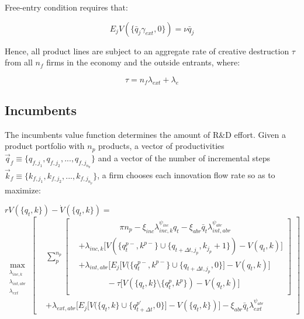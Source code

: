 \documentclass[letterpaper,12pt]{article}
\theoremstyle{definition}
\begin{document}
Free-entry condition requires that:

\begin{equation} \label{eq:Free-entry}
E_jV(\{\bar{q}_j\gamma_{ext},0\}) = \nu\bar{q}_j
\end{equation}

Hence, all product lines are subject to an aggregate rate of creative destruction $\tau$ from all $n_f$ firms in the economy and the outside entrants, where:

\begin{equation} \label{eq:Tau}
\tau = n_f\lambda_{ext} + \lambda_e
\end{equation}

\subsection{Incumbents}

The incumbents value function determines the amount of R\&D effort. Given a product portfolio with $n_p$ products, a vector of productivities $\overrightarrow{q}_f \equiv \{q_{f,j_1}, q_{f,j_2}, ..., q_{f,j_{n_p}}\}$ and a vector of the number of incremental steps $\overrightarrow{k}_f \equiv \{k_{f,j_1}, k_{f,j_2}, ..., k_{f,j_{n_p}}\}$, a firm chooses each innovation flow rate so as to maximize:

$rV(\{q_t,k\}) - \dot{V}(\{q_t,k\}) =$
\begin{equation} \label{eq:Vincumb}
\max_{\substack{\lambda_{inc,k}\\\lambda_{int, abr}\\\lambda_{ext}}}\left[\begin{aligned}
		&\sum_p^{n_p}\left[\begin{aligned}
			&\qquad\qquad\quad\pi n_{p} - \xi_{inc}\lambda_{inc,k}^{\psi_{inc}}q_t - \xi_{abr}\bar{q}_t\lambda_{int,abr}^{\psi_{abr}}\\
			& + \lambda_{inc,k}\big[V(\{q_t^{p-}, k^{p-}\}\cup \{q_{t+\Delta t, j_p}, k_{j_p} + 1\}) - V(q_{t},k)\big]\\
			&+ \lambda_{int, abr}\big[E_j\big[V(\{q_t^{p-},k^{p-}\}\cup \{q_{t+\Delta t,j_p}, 0\}\big] - V(q_{t},k)\big]\\
			&\qquad\quad \ \ - \tau\big[V(\{q_t,k\}\setminus \{q_t^p,k^p\}) - V(q_t,k)\big]\\
		\end{aligned}\right]\\
		&+ \lambda_{ext, abr}\big[E_j\big[V(\{q_t,k\}\cup \{q_{t+\Delta t}^{p'},0\}\big] - V(\{q_t,k\})\big] - \xi_{abr}\bar{q}_t\lambda_{ext}^{\psi_{abr}}
	\end{aligned}\right] 
\end{equation}
\end{document}
